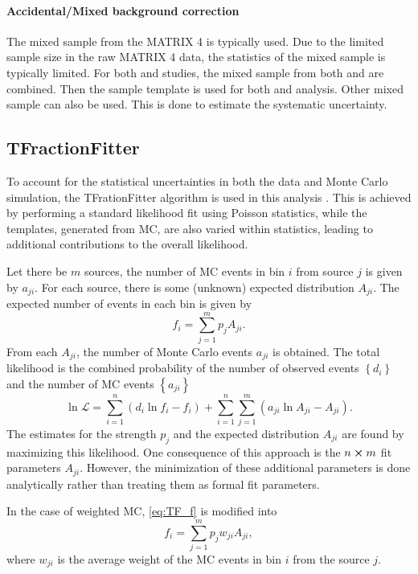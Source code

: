\documentclass[../main.tex]{subfiles}
\begin{document}
\paragraph{Accidental/Mixed background correction}
The mixed sample from the MATRIX 4 is typically used. Due to the limited sample size in the raw
MATRIX 4 data, the statistics of the mixed sample is typically limited. For both  and
 studies, the mixed sample from both  and  are combined. Then the sample
template is used for both  and  analysis.
Other mixed sample can also be used. This is done to estimate the systematic uncertainty.

\subsection{TFractionFitter}
To account for the statistical uncertainties in both the data and Monte Carlo
simulation, the TFrationFitter algorithm is used in this analysis \cite{barlow1993}.
This is achieved by performing a standard likelihood fit using Poisson statistics,
while the templates, generated from MC, are also varied within statistics, leading
to additional contributions to the overall likelihood.

Let there be $m$ sources, the number of MC events in bin $i$ from source $j$
is given by $a_{ji}$. For each source, there is some (unknown) expected distribution
$A_{ji}$. The expected number of events in each bin is given by
\begin{equation}
	f_i = \sum^m_{j=1} p_j A_{ji}.
	\label{eq:TF_f}
\end{equation}
From each $A_{ji}$, the number of Monte Carlo events $a_{ji}$ is obtained.
The total likelihood is the combined probability of the number of observed events $\left\{d_i\right\}$
and the number of MC events $\left\{a_{ji}\right\}$
\begin{equation}
	\ln \mathcal{L} = \sum^n_{i=1} \left(d_i \ln f_i -f_i\right) + \sum^n_{i=1} \sum^m_{j=1} \left(a_{ji} \ln A_{ji} - A_{ji}\right).
	\label{eq:TF_likelihood}
\end{equation}
The estimates for the strength $p_j$ and the expected distribution $A_{ji}$ are
found by maximizing this likelihood. One consequence of this approach is the
$n \cross m$ fit parameters $A_{ji}$. However, the  minimization of these additional
parameters is done analytically rather than treating them as formal fit parameters.

In the case of weighted MC, \cref{eq:TF_f} is modified into
\begin{equation}
	f_i = \sum^m_{j=1} p_j w_{ji}A_{ji},
\end{equation}
where $w_{ji}$ is the average weight of the MC events in bin $i$ from the source $j$.
\end{document}
